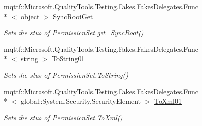 \begin{DoxyCompactItemize}
mqttf\-::\-Microsoft.\-Quality\-Tools.\-Testing.\-Fakes.\-Fakes\-Delegates.\-Func\\*
$<$ object $>$ \hyperlink{class_system_1_1_security_1_1_fakes_1_1_stub_permission_set_acfaeacee900a85440a6cbeeab3953e4a}{Sync\-Root\-Get}
\begin{DoxyCompactList}\small\item\em Sets the stub of Permission\-Set.\-get\-\_\-\-Sync\-Root()\end{DoxyCompactList}\item 
mqttf\-::\-Microsoft.\-Quality\-Tools.\-Testing.\-Fakes.\-Fakes\-Delegates.\-Func\\*
$<$ string $>$ \hyperlink{class_system_1_1_security_1_1_fakes_1_1_stub_permission_set_a5c71d4aed43b6b3a3b78d45d5fee1eaa}{To\-String01}
\begin{DoxyCompactList}\small\item\em Sets the stub of Permission\-Set.\-To\-String()\end{DoxyCompactList}\item 
mqttf\-::\-Microsoft.\-Quality\-Tools.\-Testing.\-Fakes.\-Fakes\-Delegates.\-Func\\*
$<$ global\-::\-System.\-Security.\-Security\-Element $>$ \hyperlink{class_system_1_1_security_1_1_fakes_1_1_stub_permission_set_a38efa6ff26ec8c7f55ed213e17283e13}{To\-Xml01}
\begin{DoxyCompactList}\small\item\em Sets the stub of Permission\-Set.\-To\-Xml()\end{DoxyCompactList}\end{DoxyCompactItemize}

